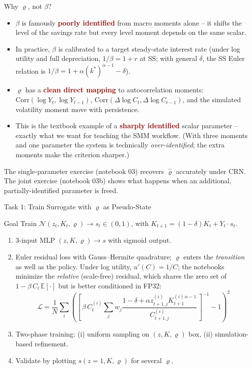 \documentclass[10pt,aspectratio=169]{beamer}
\newcommand{\E}[1]{\mathbb{E}\!\left[#1\right]}
\newcommand{\emphc}[1]{\textbf{\textcolor{darkred}{#1}}}
\begin{document}
\begin{frame}{Why $\varrho$, not $\beta$?}
\small
\begin{itemize}
  \item $\beta$ is famously \emphc{poorly identified} from macro moments alone -- it shifts the level of the savings rate but every level moment depends on the same scalar.
  \item In practice, $\beta$ is calibrated to a target steady-state interest rate (under log utility and full depreciation, $1/\beta = 1+r$ at SS; with general $\delta$, the SS Euler relation is $1/\beta = 1 + \alpha (k^*)^{\alpha-1} - \delta$).
  \item $\varrho$ has a \emphc{clean direct mapping} to autocorrelation moments: $\mathrm{Corr}(\log Y_t, \log Y_{t-1})$, $\mathrm{Corr}(\Delta\log C_t, \Delta\log C_{t-1})$, and the simulated volatility moment move with persistence.
  \item This is the textbook example of a \emphc{sharply identified} scalar parameter -- exactly what we want for teaching the SMM workflow. (With three moments and one parameter the system is technically \emph{over-identified}; the extra moments make the criterion sharper.)
\end{itemize}
\vspace{0.2cm}
The single-parameter exercise (notebook 03) recovers $\hat\varrho$ accurately under CRN. The joint exercise (notebook 03b) shows what happens when an additional, partially-identified parameter is freed.
\end{frame}

\begin{frame}{Task 1: Train Surrogate with $\varrho$ as Pseudo-State}
\begin{block}{Goal}
Train $\mathcal{N}(z_t, K_t, \varrho) \to s_t \in (0,1)$, with $K_{t+1} = (1-\delta)K_t + Y_t \cdot s_t$.
\end{block}
\begin{enumerate}
  \itemsep1pt
  \item 3-input MLP $(z, K, \varrho) \to s$ with sigmoid output.
  \item Euler residual loss with Gauss--Hermite quadrature; $\varrho$ enters the \emph{transition} as well as the policy. Under log utility, $u'(C) = 1/C$; the notebooks minimize the \emph{relative} (scale-free) residual, which shares the zero set of $1 - \beta\,C_t\,\E{\cdot}$ but is better conditioned in FP32:
  {\small\[
  \mathcal{L} = \frac{1}{N}\sum_i \!\left(\left[\,\beta\, C^{(i)}_t \sum_j w_j \frac{1-\delta + \alpha z^{(i)}_{t+1,j} K^{(i)\,\alpha-1}_{t+1}}{C^{(i)}_{t+1,j}}\,\right]^{-1} - 1\right)^{\!2}
  \]}
  \vspace{-10pt}
  \item Two-phase training: (i) uniform sampling on $(z, K, \varrho)$ box, (ii) simulation-based refinement.
  \item Validate by plotting $s(z=1, K, \varrho)$ for several $\varrho$.
\end{enumerate}
\end{frame}
\end{document}

